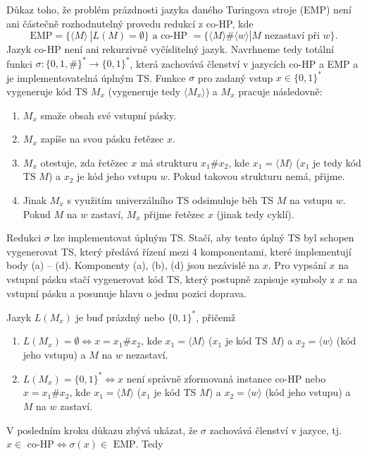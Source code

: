 \documentclass[a4paper,12pt]{article}
\begin{document}
\begin{enumerate}[label=\textbf{\arabic*}.]
 Důkaz toho, že problém prázdnosti jazyka daného Turingova stroje (EMP) není ani částečně rozhodnutelný provedu
 redukcí z co-HP, kde $$\mbox{EMP} = \{\langle M\rangle\ | L(M) = \emptyset\} \mbox{ a }\mbox{co-HP }= \{\langle M\rangle\#\langle w\rangle | M \mbox{ nezastaví při } w\}.$$ Jazyk co-HP není ani
 rekurzivně vyčíslitelný jazyk. Navrhneme tedy totální funkci $\sigma: \{0,1,\#\}^* \rightarrow \{0,1\}^*$, která zachovává
 členství v jazycích co-HP a EMP a je implementovatelná úplným TS. Funkce $\sigma$ pro zadaný vstup $x\in\{0,1\}^*$
 vygeneruje kód TS $M_x$ (vygeneruje tedy $\langle M_x\rangle$) a $M_x$ pracuje následovně:
 \begin{enumerate}
  \item $M_x$ smaže obsah své vstupní pásky.
  \item $M_x$ zapíše na svou pásku řetězec $x$.
  \item $M_x$ otestuje, zda řetězec $x$ má strukturu $x_1\#x_2$, kde $x_1 = \langle M\rangle$ ($x_1$ je tedy kód TS $M$) a 
    $x_2$ je kód jeho vstupu $w$. Pokud takovou strukturu nemá, přijme.
  \item Jinak $M_x$ s využitím univerzálního TS odsimuluje běh TS $M$ na vstupu $w$. Pokud $M$ na $w$ zastaví, 
    $M_x$ přijme řetězec $x$ (jinak tedy cyklí).
 \end{enumerate}
 Redukci $\sigma$ lze implementovat úplným TS. Stačí, aby tento úplný TS byl schopen vygenerovat TS, který
 předává řízení mezi 4 komponentami, které implementují body (a) -- (d). Komponenty (a), (b), (d) jsou 
 nezávislé na $x$. Pro vypsání $x$ na vstupní pásku stačí vygenerovat kód TS, který postupně zapisuje
 symboly z $x$ na vstupní pásku a posunuje hlavu o jednu pozici doprava.
 
 Jazyk $L(M_x)$ je buď prázdný nebo $\{0,1\}^*$, přičemž
 \begin{enumerate}
  \item $L(M_x) = \emptyset \Leftrightarrow x = x_1\#x_2$, kde $x_1 = \langle M\rangle$ ($x_1$ je kód TS $M$) a 
  $x_2 = \langle w\rangle$ (kód jeho vstupu) a $M$ na $w$ nezastaví.
  \item $L(M_x) = \{0,1\}^* \Leftrightarrow x$ není správně zformovaná instance co-HP nebo 
  $x = x_1\#x_2$, kde $x_1 = \langle M\rangle$ ($x_1$ je kód TS $M$) a 
  $x_2 = \langle w\rangle$ (kód jeho vstupu) a $M$ na $w$ zastaví.
 \end{enumerate}
 
 V posledním kroku důkazu zbývá ukázat, že $\sigma$ zachovává členství v jazyce, tj. $x\in\mbox{ co-HP} \Leftrightarrow \sigma(x)\in\mbox{ EMP}$.
 Tedy 
 

\end{enumerate}
\end{document}
